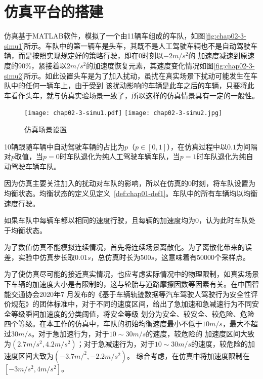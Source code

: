 \section{仿真平台的搭建}
\label{sec:simulation-platform}

仿真基于MATLAB软件，模拟了一个由11辆车组成的车队，如图\ref{fig:chap02-3-simu1}所示。车队中的第一辆车是头车，其既不是人工驾驶车辆也不是自动驾驶车辆，而是按照实现规定好的策略行驶，即在0时刻以$-2m/s^2$的
加速度减速到原速度的$90\%$，紧接着以$2m/s^2$的加速度恢复元素，其速度变化情况如图\ref{fig:chap02-3-simu2}所示。如此设置头车是为了加入扰动，虽扰在真实场景下扰动可能发生在车队中的任何一辆车上，由于受到
该扰动影响的车辆是此车之后的车辆，只要将此车看作头车，就与仿真实验场景一致了，所以这样的仿真情景具有一定的一般性。

\begin{figure}
  \centering
    {\texttt{[image: chap02-3-simu1.pdf]}}
    {\texttt{[image: chap02-3-simu2.jpg]}}
  \caption{仿真场景设置}
  \label{fig:chap02-2-simu}
\end{figure}

10辆跟随车辆中自动驾驶车辆的占比为$p$（$p \in [0, 1]$），在仿真过程中以$0.1$为间隔对$p$取值，当$p=0$时车队退化为纯人工驾驶车辆车队，当$p=1$时车队退化为纯自动驾驶车辆车队。

因为仿真主要关注加入的扰动对车队的影响，所以在仿真的0时刻，将车队设置为均衡状态。均衡状态的定义见定义~\ref{def:chap01-def1}。车队中的所有车辆均以均衡速度行驶。

\begin{definition}[车队的均衡状态]
  如果车队中每辆车都以相同的速度行驶，且每辆的加速度均为0，认为此时车队处于均衡状态。
  \label{def:chap01-def1}
\end{definition}

为了数值仿真不能模拟连续情况，首先将连续场景离散化。为了离散化带来的误差，实验中仿真步长取$0.01s$，总仿真时长为$500s$，这意味着有50000个采样点。

为了使仿真尽可能的接近真实情况，也应考虑实际情况中的物理限制，如真实场景下车辆的加速度大小是有限制的，这与轮胎与道路摩擦因数等因素有关。在中国智能交通协会2020年7
月发布的《基于车辆轨迹数据等汽车驾驶人驾驶行为安全性评价规范》的团体标准中，对于不同的速度区间，给出了急加速和急减速行为不同安全等级瞬间加速度的分类阈值，将安全等级
划分为安全、较安全、较危险、危险四个等级。在本工作的仿真中，车队的初始均衡速度最小不低于$10m/s$，最大不超过$30m/s$。对于急加速行为，对于$10\sim 30m/s$的速度，较危险的
加速度区间大致为$(2.7m/s^2, 4.2m/s^2)$；对于急减速行为，对于$10\sim 30m/s$的速度，较危险的加速度区间大致为$(-3.7m/^2, -2.2m/s^2)$\cite{2020safety}。
综合考虑，在仿真中将加速度限制在$[-3m/s^2, 4m/s^2]$。

